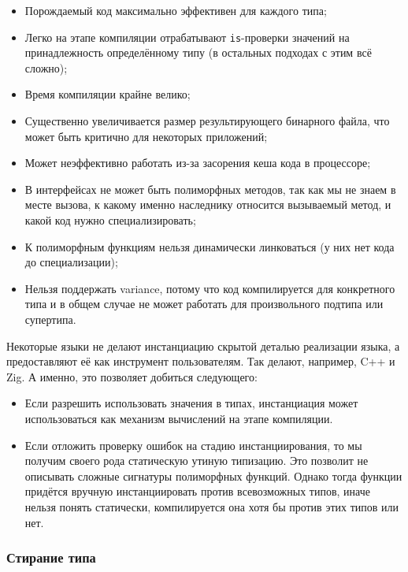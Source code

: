 \begin{itemize}
    \item[\positive] Порождаемый код максимально эффективен для каждого типа;
    \item[\positive] Легко на этапе компиляции отрабатывают \texttt{is}-проверки значений на принадлежность определённому типу (в остальных подходах с этим всё сложно); %
    \item[\negative] Время компиляции крайне велико;
    \item[\negative] Существенно увеличивается размер результирующего бинарного файла, что может быть критично для некоторых приложений;
    \item[\negative] Может неэффективно работать из-за засорения кеша кода в процессоре;
    \item[\negative] В интерфейсах не может быть полиморфных методов, так как мы не знаем в месте вызова, к какому именно наследнику относится вызываемый метод, и какой код нужно специализировать;
    \item[\negative] К полиморфным функциям нельзя динамически линковаться (у них нет кода до специализации);
    \item[\negative] Нельзя поддержать variance, потому что код компилируется для конкретного типа и в общем случае не может работать для произвольного подтипа или супертипа.
\end{itemize}

Некоторые языки не делают инстанциацию скрытой деталью реализации языка, а предоставляют её как инструмент пользователям.
Так делают, например, C++ и Zig.
А именно, это позволяет добиться следующего:
\begin{itemize}
    \item Если разрешить использовать значения в типах, инстанциация может использоваться как механизм вычислений на этапе компиляции. %
    \item Если отложить проверку ошибок на стадию инстанциирования, то мы получим своего рода статическую утиную типизацию.
    Это позволит не описывать сложные сигнатуры полиморфных функций.
    Однако тогда функции придётся вручную инстанциировать против всевозможных типов, иначе нельзя понять статически, компилируется она хотя бы против этих типов или нет.
\end{itemize}


\subsubsection{Стирание типа} \label{subsubsec:type-erasure}

